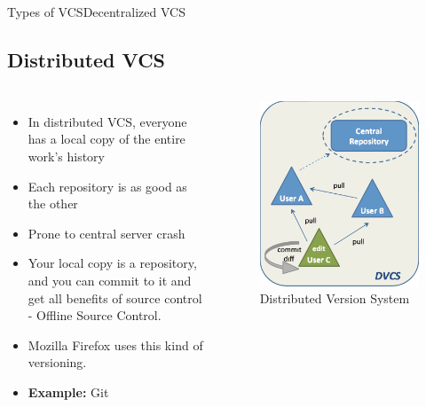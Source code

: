 \documentclass{beamer}
\begin{document}
\begin{frame}{Types of VCS}{Decentralized VCS}
\subsection{Distributed VCS}
\begin{columns}
\begin{itemize}
		  \item {
		    In distributed VCS, everyone has a local copy of the entire work’s history
		  }
		  \item {
		    Each repository is as good as the other
		  }
		  \item{
			Prone to central server crash
		  }
		  \item{
			Your local copy is a repository, and you can commit to it and get all benefits of source control - Offline Source Control.
		  }	  
		  \item{
			Mozilla Firefox uses this kind of versioning.  
		  }
		  \item{
           \textbf{ Example: }Git		  
		  }
	  \end{itemize}
\begin{figure}
	 \includegraphics[width=.9\textwidth]{images/dvcs}
	 \caption{Distributed Version System \cite{website}}
 \end{figure}
\end{columns}
\end{frame}	
\end{document}
